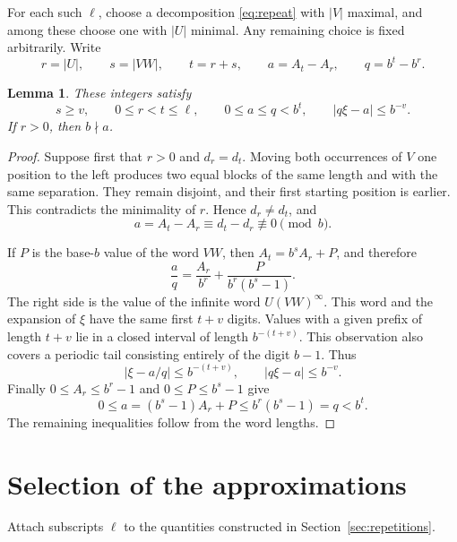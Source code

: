 \documentclass[11pt]{article}
\numberwithin{equation}{section}
\newtheorem{lemma}[theorem]{Lemma}
\theoremstyle{remark}
\begin{document}
For each such $\ell$, choose a decomposition \eqref{eq:repeat} with
$|V|$ maximal, and among these choose one with $|U|$ minimal.
Any remaining choice is fixed arbitrarily. Write
\[
 r=|U|,\qquad s=|VW|,\qquad t=r+s,\qquad
 a=A_t-A_r,\qquad q=b^t-b^r.
\]

\begin{lemma}\label{lem:approx}
These integers satisfy
\begin{equation}\label{eq:structure}
 s\ge v,\qquad 0\le r<t\le\ell,\qquad
 0\le a\le q<b^t,\qquad |q\xi-a|\le b^{-v}.
\end{equation}
If $r>0$, then $b\nmid a$.
\end{lemma}
\begin{proof}
Suppose first that $r>0$ and $d_r=d_t$.
Moving both occurrences of $V$ one position to the left produces two
equal blocks of the same length and with the same separation.
They remain disjoint, and their first starting position is earlier.
This contradicts the minimality of $r$. Hence $d_r\ne d_t$, and
\[
 a=A_t-A_r\equiv d_t-d_r\not\equiv0\pmod b.
\]

If $P$ is the base-$b$ value of the word $VW$, then
$A_t=b^sA_r+P$, and therefore
\begin{equation}\label{eq:periodic}
 \frac aq
 =\frac{A_r}{b^r}+\frac{P}{b^r(b^s-1)}.
\end{equation}
The right side is the value of the infinite word $U(VW)^\infty$.
This word and the expansion of $\xi$ have the same first $t+v$
digits. Values with a given prefix of length $t+v$ lie in a closed
interval of length $b^{-(t+v)}$. This observation also covers a
periodic tail consisting entirely of the digit $b-1$. Thus
\[
 |\xi-a/q|\le b^{-(t+v)},\qquad |q\xi-a|\le b^{-v}.
\]
Finally $0\le A_r\le b^r-1$ and $0\le P\le b^s-1$ give
\[
 0\le a=(b^s-1)A_r+P\le b^r(b^s-1)=q<b^t.
\]
The remaining inequalities follow from the word lengths.
\end{proof}

\section{Selection of the approximations}\label{sec:selection}

Attach subscripts $\ell$ to the quantities constructed in
Section~\ref{sec:repetitions}.
\end{document}
